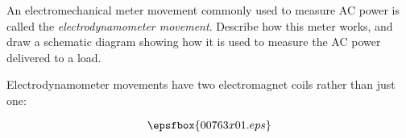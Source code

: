 

An electromechanical meter movement commonly used to measure AC power is called the {\it electrodynamometer movement}.  Describe how this meter works, and draw a schematic diagram showing how it is used to measure the AC power delivered to a load.







Electrodynamometer movements have two electromagnet coils rather than just one:

$$\epsfbox{00763x01.eps}$$











